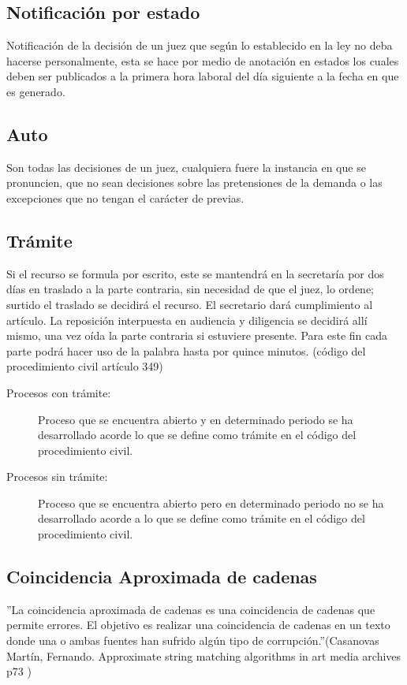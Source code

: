 \subsection{Notificaci\'on por estado} 
Notificaci\'on de la decisi\'on de un juez que seg\'un lo establecido en la 
ley no deba hacerse personalmente, esta se hace por medio de anotaci\'on 
en estados los cuales deben ser publicados a la primera hora laboral 
del d\'ia siguiente a la fecha en que es generado.

\subsection{Auto}
Son todas las decisiones de un juez, cualquiera fuere la instancia en 
que se pronuncien, que no sean decisiones sobre las pretensiones de
la demanda o las excepciones que no tengan el car\'acter de previas.

\subsection{Tr\'amite} Si el recurso se formula por escrito, este se mantendr\'a en la secretar\'ia por dos d\'ias en traslado a la parte contraria, sin necesidad de que el juez, lo ordene; surtido el traslado se decidir\'a el recurso. El secretario dar\'a cumplimiento al art\'iculo.
La reposici\'on interpuesta en audiencia y diligencia se decidir\'a all\'i mismo, una vez o\'ida la parte contraria si estuviere presente. Para este fin cada parte podr\'a hacer uso de la palabra hasta por quince minutos. (c\'odigo del procedimiento civil art\'iculo 349)
\begin{description}
\item[Procesos con tr\'amite:] Proceso que se encuentra abierto y en 
determinado periodo se ha desarrollado acorde lo que  se define como 
tr\'amite en el c\'odigo del procedimiento civil.

\item[Procesos sin tr\'amite:] Proceso que se encuentra abierto pero en 
determinado periodo no se ha desarrollado acorde a lo que se define 
como tr\'amite en el c\'odigo del procedimiento civil.
\end{description}

\subsection{Coincidencia Aproximada de cadenas}  
''La coincidencia aproximada de cadenas es una coincidencia de cadenas 
que permite errores. El objetivo es realizar una coincidencia de 
cadenas en un texto donde una o ambas fuentes han sufrido alg\'un tipo 
de corrupci\'on.''(Casanovas Mart\'in, Fernando. Approximate string matching algorithms in art media archives p73 )

